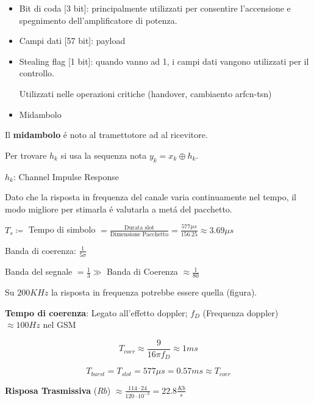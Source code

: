 \documentclass{article}
\begin{document}
\begin{itemize}
    \item Bit di coda [3 bit]: principalmente utilizzati per consentire l'accensione e spegnimento dell'amplificatore di potenza.
    \item Campi dati [57 bit]: payload
    \item Stealing flag [1 bit]: quando vanno ad 1, i campi dati vangono utilizzati per il controllo.

        Utilizzati nelle operazioni critiche (handover, cambiaento arfcn-tsn)
    \item Midambolo
\end{itemize}

Il \textbf{midambolo} \'e noto al tramettotore ad al ricevitore.

\begin{center}
\end{center}

Per trovare $h_k$ si usa la sequenza nota $y_k = x_k \oplus h_k$.

$h_k$: Channel Impulse Response

Dato che la risposta in frequenza del canale varia continuamente nel tempo, il modo migliore per stimarla \'e valutarla a met\'a del pacchetto.

$T_s \coloneqq$ Tempo di simbolo $ = \frac{\text{Durata slot}}{\text{Dimensione Pacchetto}} = \frac{577 \mu s}{156.25} \approx 3.69\mu s$

Banda di coerenza: $\frac{1}{5\sigma}$

Banda del segnale $=\frac{1}{3} \gg$ Banda di Coerenza $\approx \frac{1}{80}$

Su $200KHz$ la risposta in frequenza potrebbe essere quella (figura).

\textbf{Tempo di coerenza}: Legato all'effetto doppler; $f_D$ (Frequenza doppler) $\approx 100Hz$ nel GSM

\[ T_{coer} \approx \frac{9}{16\pi f_D} \approx 1ms \]

\[T_{burst} = T_{slot} = 577 \mu s = 0.57 ms \approx T_{coer}\]

\textbf{Risposa Trasmissiva} ($Rb$) $\approx \frac{114\cdot24}{120\cdot10^{-3}} = 22.8\frac{Kb}{s}$
\end{document}
